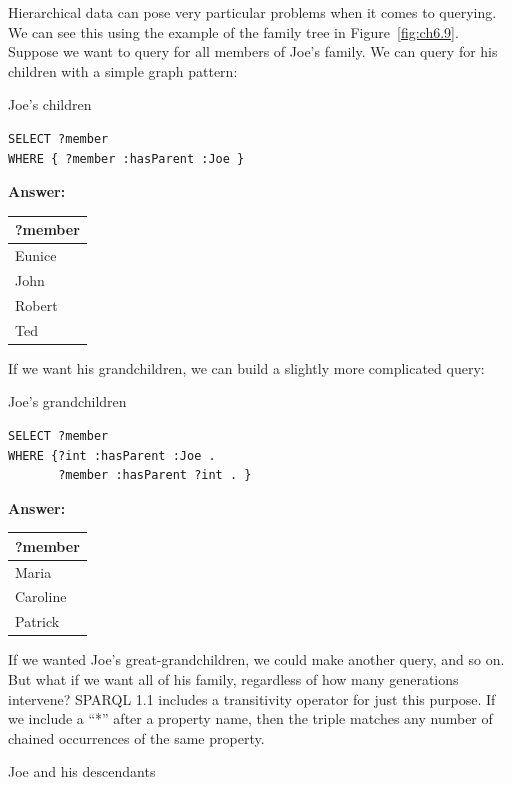 Hierarchical data can pose very particular problems when it comes to
querying. We can see this using the example of the family tree in Figure~\ref{fig:ch6.9}.
Suppose we want to query for all members of Joe's family. We can
query for his children with a simple graph pattern:

\begin{query}Joe's children\end{query}

\begin{lstlisting}
SELECT ?member
WHERE { ?member :hasParent :Joe }
\end{lstlisting}

\textbf{\textbf{Answer:}}

\begin{tabular}{|l|}
\hline
?member\\
\hline
Eunice\\
John\\
Robert\\
Ted\\
\hline
\end{tabular}

If we want his grandchildren, we can build a slightly more complicated
query:

\begin{query}Joe's grandchildren\end{query}

\begin{lstlisting}
SELECT ?member
WHERE {?int :hasParent :Joe .
       ?member :hasParent ?int . }
\end{lstlisting}

\textbf{\textbf{Answer:}}

\begin{tabular}{|l|}
\hline
?member\\
\hline
Maria\\
Caroline\\
Patrick\\
\hline
\end{tabular}

If we wanted Joe's great-grandchildren, we could make another query, and
so on. But what if we want all of his family, regardless of how many
generations intervene? SPARQL 1.1 includes a transitivity operator for
just this purpose. If we include a ``*'' after a property name, then the
triple matches any number of chained occurrences of the same property.

\begin{query}Joe and his descendants\end{query}

